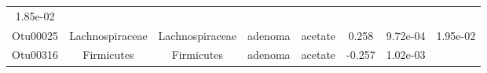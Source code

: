 \documentclass[11pt,]{article}
\begin{document}
\begin{longtable}[]{@{}cccccccc@{}}
\begin{minipage}[t]{0.08\columnwidth}
1.85e-02\strut
\end{minipage}\tabularnewline
\begin{minipage}[t]{0.08\columnwidth}\centering\strut
Otu00025\strut
\end{minipage} & \begin{minipage}[t]{0.15\columnwidth}\centering\strut
Lachnospiraceae\strut
\end{minipage} & \begin{minipage}[t]{0.15\columnwidth}\centering\strut
Lachnospiraceae\strut
\end{minipage} & \begin{minipage}[t]{0.08\columnwidth}\centering\strut
adenoma\strut
\end{minipage} & \begin{minipage}[t]{0.09\columnwidth}\centering\strut
acetate\strut
\end{minipage} & \begin{minipage}[t]{0.07\columnwidth}\centering\strut
0.258\strut
\end{minipage} & \begin{minipage}[t]{0.08\columnwidth}\centering\strut
9.72e-04\strut
\end{minipage} & \begin{minipage}[t]{0.08\columnwidth}\centering\strut
1.95e-02\strut
\end{minipage}\tabularnewline
\begin{minipage}[t]{0.08\columnwidth}\centering\strut
Otu00316\strut
\end{minipage} & \begin{minipage}[t]{0.15\columnwidth}\centering\strut
Firmicutes\strut
\end{minipage} & \begin{minipage}[t]{0.15\columnwidth}\centering\strut
Firmicutes\strut
\end{minipage} & \begin{minipage}[t]{0.08\columnwidth}\centering\strut
adenoma\strut
\end{minipage} & \begin{minipage}[t]{0.09\columnwidth}\centering\strut
acetate\strut
\end{minipage} & \begin{minipage}[t]{0.07\columnwidth}\centering\strut
-0.257\strut
\end{minipage} & \begin{minipage}[t]{0.08\columnwidth}\centering\strut
1.02e-03\strut
\end{minipage} & \begin{minipage}[t]{0.08\columnwidth}\centering\strut

\end{minipage}
\end{longtable}
\end{document}
